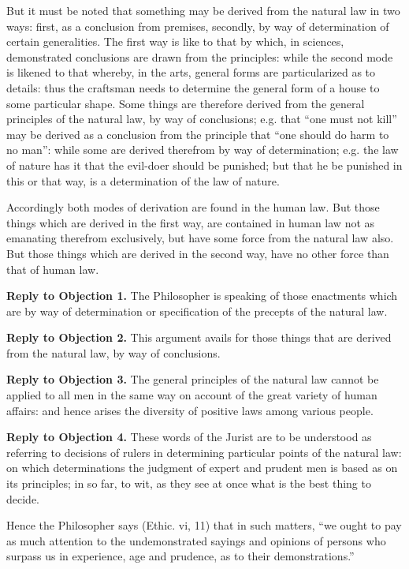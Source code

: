 But it must be noted that something may be derived from the natural law in two ways: first, as a conclusion from premises, secondly, by way of determination of certain generalities. The first way is like to that by which, in sciences, demonstrated conclusions are drawn from the principles: while the second mode is likened to that whereby, in the arts, general forms are particularized as to details: thus the craftsman needs to determine the general form of a house to some particular shape. Some things are therefore derived from the general principles of the natural law, by way of conclusions; e.g. that ``one must not kill'' may be derived as a conclusion from the principle that ``one should do harm to no man'': while some are derived therefrom by way of determination; e.g. the law of nature has it that the evil-doer should be punished; but that he be punished in this or that way, is a determination of the law of nature.

Accordingly both modes of derivation are found in the human law. But those things which are derived in the first way, are contained in human law not as emanating therefrom exclusively, but have some force from the natural law also. But those things which are derived in the second way, have no other force than that of human law.

\textbf{Reply to Objection 1.} The Philosopher is speaking of those enactments which are by way of determination or specification of the precepts of the natural law.

\textbf{Reply to Objection 2.} This argument avails for those things that are derived from the natural law, by way of conclusions.

\textbf{Reply to Objection 3.} The general principles of the natural law cannot be applied to all men in the same way on account of the great variety of human affairs: and hence arises the diversity of positive laws among various people.

\textbf{Reply to Objection 4.} These words of the Jurist are to be understood as referring to decisions of rulers in determining particular points of the natural law: on which determinations the judgment of expert and prudent men is based as on its principles; in so far, to wit, as they see at once what is the best thing to decide.

Hence the Philosopher says (Ethic. vi, 11) that in such matters, ``we ought to pay as much attention to the undemonstrated sayings and opinions of persons who surpass us in experience, age and prudence, as to their demonstrations.''

